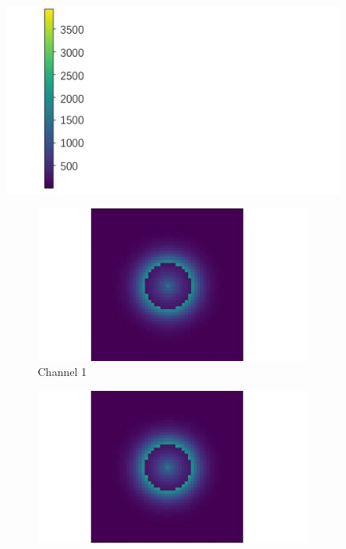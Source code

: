 \begin{figure}[htbp]
    \centering
    \begin{minipage}{0.10\textwidth}
        \centering
        \includegraphics[width=\textwidth]{figures/raw_data/21/color_bar.pdf}
    \end{minipage}
    \begin{minipage}{0.87\textwidth}
        \centering
        \begin{subfigure}{0.23\textwidth}
            \includegraphics[width=\textwidth]{figures/raw_data/21/channel_1.pdf}
            \caption{Channel 1}
        \end{subfigure}
        \begin{subfigure}{0.23\textwidth}
            \includegraphics[width=\textwidth]{figures/raw_data/21/channel_2.pdf}

\end{subfigure}
\end{minipage}
\end{figure}
